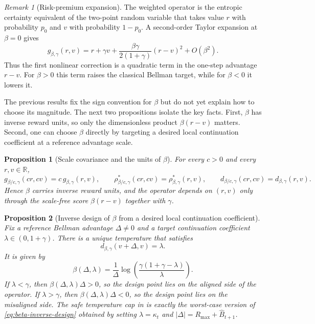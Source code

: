 \documentclass{article}
\newtheorem{proposition}[proposition]{Proposition}
\theoremstyle{remark}
\newtheorem{remark}[remark]{Remark}
\newcommand{\R}{\mathbb{R}}
\newcommand{\gbg}{g_{\beta,\gamma}}
\newcommand{\pprior}{p_0}
\newcommand{\Bhat}{\widehat B}
\begin{document}
\begin{remark}[Risk-premium expansion]
\label{rem:risk-premium}
The weighted operator is the entropic certainty equivalent of the two-point random variable that
takes value $r$ with probability $\pprior$ and $v$ with probability $1-\pprior$. A second-order
Taylor expansion at $\beta=0$ gives
\begin{equation}
\gbg(r,v)
=
r+\gamma v
+
\frac{\beta\gamma}{2(1+\gamma)}(r-v)^2
+
O(\beta^2).
\label{eq:risk-premium}
\end{equation}
Thus the first nonlinear correction is a quadratic term in the one-step advantage $r-v$. For
$\beta>0$ this term raises the classical Bellman target, while for $\beta<0$ it lowers it.
\end{remark}

The previous results fix the sign convention for $\beta$ but do not yet explain how to choose its magnitude. The next two propositions isolate the key facts. First, $\beta$ has inverse reward units, so only the dimensionless product $\beta(r-v)$ matters. Second, one can choose $\beta$ directly by targeting a desired local continuation coefficient at a reference advantage scale.

\begin{proposition}[Scale covariance and the units of $\beta$]
\label{prop:beta-scale}
For every $c>0$ and every $r,v\in\R$,
\[
g_{\beta/c,\gamma}(cr,cv)=c\,g_{\beta,\gamma}(r,v),
\qquad
\rho^*_{\beta/c,\gamma}(cr,cv)=\rho^*_{\beta,\gamma}(r,v),
\qquad
d_{\beta/c,\gamma}(cr,cv)=d_{\beta,\gamma}(r,v).
\]
Hence $\beta$ carries inverse reward units, and the operator depends on $(r,v)$ only through the scale-free score $\beta(r-v)$ together with $\gamma$.
\end{proposition}

\begin{proposition}[Inverse design of $\beta$ from a desired local continuation coefficient]
\label{prop:beta-inverse-design}
Fix a reference Bellman advantage $\Delta\neq 0$ and a target continuation coefficient $\lambda\in(0,1+\gamma)$. There is a unique temperature that satisfies
\[
d_{\beta,\gamma}(v+\Delta,v)=\lambda.
\]
It is given by
\begin{equation}
\beta(\Delta,\lambda)
=
\frac{1}{\Delta}
\log\!\left(\frac{\gamma(1+\gamma-\lambda)}{\lambda}\right).
\label{eq:beta-inverse-design}
\end{equation}
If $\lambda<\gamma$, then $\beta(\Delta,\lambda)\Delta>0$, so the design point lies on the aligned side of the operator. If $\lambda>\gamma$, then $\beta(\Delta,\lambda)\Delta<0$, so the design point lies on the misaligned side. The safe temperature cap in  is exactly the worst-case version of \eqref{eq:beta-inverse-design} obtained by setting $\lambda=\kappa_t$ and $|\Delta|=R_{\max}+\Bhat_{t+1}$.
\end{proposition}
\end{document}
